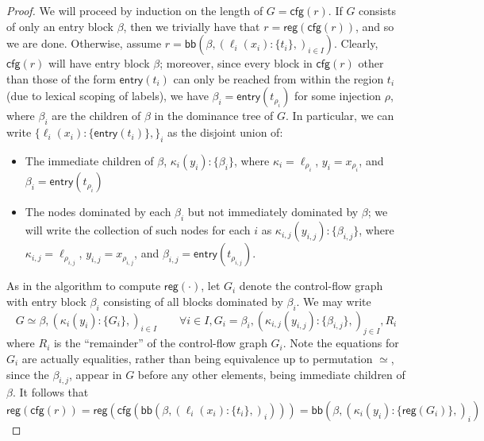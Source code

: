 \documentclass[acmsmall,screen,review]{acmart}
\newcommand{\ms}[1]{\ensuremath{\mathsf{#1}}}
\newcommand{\lto}{:}
\newcommand{\wbranch}[3]{#1(#2) \lto \{#3\}}
\newcommand{\toentry}[1]{\ms{entry}(#1)}
\newcommand{\tocfg}[1]{\ms{cfg}(#1)}
\newcommand{\adddom}[2]{\ms{bb}(#1, #2)}
\newcommand{\toreg}[1]{\ms{reg}(#1)}
\begin{document}
\label{proof:cfg-conversion}

\begin{proof}
  We will proceed by induction on the length of $G = \tocfg{r}$. If $G$ consists of only an entry
  block $\beta$, then we trivially have that $r = \toreg{\tocfg{r}}$, and so we are done. Otherwise,
  assume $r = \adddom{\beta}{(\wbranch{\ell_i}{x_i}{t_i},)_{i \in I}}$. Clearly, $\tocfg{r}$ will
  have entry block $\beta$; moreover, since every block in $\tocfg{r}$ other than those of the form
  $\toentry{t_i}$ can only be reached from within the region $t_i$ (due to lexical scoping of
  labels), we have $\beta_i = \toentry{t_{\rho_i}}$ for some injection $\rho$, where $\beta_i$ are
  the children of $\beta$ in the dominance tree of $G$. In particular, we can write
  $\{\wbranch{\ell_i}{x_i}{\toentry{t_i}},\}_i$ as the disjoint union of:
  \begin{itemize}
    \item The immediate children of $\beta$, $\wbranch{\kappa_i}{y_i}{\beta_i}$, where 
      $\kappa_i = \ell_{\rho_i}$, $y_i = x_{\rho_i}$, and $\beta_i = \toentry{t_{\rho_i}}$
    \item The nodes dominated by each $\beta_i$ but not immediately dominated by $\beta$; we will
    write the collection of such nodes for each $i$ as $\wbranch{\kappa_{i, j}}{y_{i, j}}{\beta_{i,
    j}}$, where $\kappa_{i, j} = \ell_{\rho_{i, j}}$, $y_{i, j} = x_{\rho_{i, j}}$, and $\beta_{i,
    j} = \toentry{t_{\rho_{i, j}}}$.
  \end{itemize}
  As in the algorithm to compute $\toreg{\cdot}$, let $G_i$ denote the control-flow graph with 
  entry block $\beta_i$ consisting of all blocks dominated by $\beta_i$. We may write
  \begin{equation}
    G \simeq \beta, (\wbranch{\kappa_i}{y_i}{G_i},)_{i \in I} \qquad
    \forall i \in I, G_i = \beta_i, (\wbranch{\kappa_{i, j}}{y_{i, j}}{\beta_{i, j}},)_{j \in I}, R_i
  \end{equation} 
  where $R_i$ is the ``remainder'' of the control-flow graph $G_i$. Note the equations for $G_i$ are
  actually equalities, rather than being equivalence up to permutation $\simeq$, since the
  $\beta_{i, j}$, appear in $G$ before any other elements, being immediate children of $\beta$. It
  follows that
  \begin{equation}
    \toreg{\tocfg{r}}
    = \toreg{\tocfg{\adddom{\beta}{(\wbranch{\ell_i}{x_i}{t_i},)_i}}}
    = \adddom{\beta}{(\wbranch{\kappa_i}{y_i}{\toreg{G_i}},)_i}
  \end{equation}

\end{proof}
\end{document}
